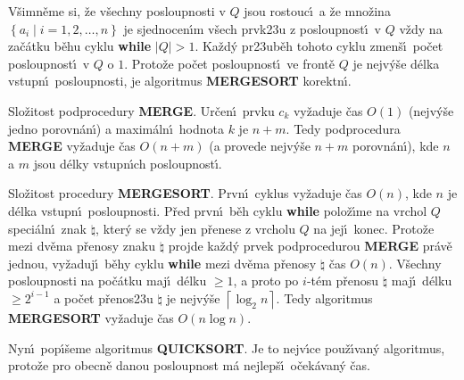 \flushpar V\v simn\v eme si, \v ze v\v sechny posloupnosti v $Q$ jsou 
rostouc\'\i\ a \v ze mno\v zina $\left\{a_i\mid i=1,2,\dots,n\right\}$ je sjednocen\'\i m 
v\v sech prvk\accent23u z posloupnost\'\i\ v $Q$ v\v zdy na za\v c\'atku 
b\v ehu cyklu {\bf while} $|Q|>1$. Ka\v zd\'y pr\accent23ub\v eh tohoto 
cyklu zmen\v s\'\i\ po\v cet posloupnost\'\i\ v $Q$ o $1$. Proto\v ze po\v cet 
posloupnost\'\i\ ve front\v e $Q$ je nejv\'y\v se d\'elka vstupn\'\i\ 
posloupnosti, je algoritmus 
{\bf MERGE\-SORT} korektn\'\i .
\medskip

\flushpar Slo\v zitost podprocedury {\bf MERGE}. Ur\v cen\'\i\ prvku $c_k$ 
vy\v za\-du\-je \v cas $O\left(1\right)$ (nejv\'y\v se jedno porovn\'an\'\i ) a 
maxim\'aln\'\i\ hodnota $k$ je $n+m$. Tedy 
podprocedura {\bf MERGE} vy\v zaduje \v cas $O\left(n+m\right)$ (a provede 
nejv\'y\v se $n+m$ 
porovn\'an\'\i ), kde $n$ a $m$ jsou d\'elky vstupn\'\i ch posloupnost\'\i .
\medskip

\flushpar Slo\v zitost procedury {\bf MERGESORT}. 
Prvn\'\i\ cyklus vy\v zaduje \v cas $O\left(n\right)$, kde $n$ je d\'elka vstupn\'\i\ posloupnosti. 
P\v red prvn\'\i\ b\v eh cyklu {\bf while} polo\v z\'\i me na vrchol $Q$ speci\'aln\'\i\ 
znak $\natural$, kter\'y se v\v zdy jen 
p\v renese z vrcholu $Q$ na jej\'\i\ konec. Proto\v ze mezi dv\v ema 
p\v renosy znaku $\natural$ projde ka\v zd\'y prvek 
podprocedurou {\bf MERGE} pr\'av\v e jednou, vy\v zaduj\'\i\ b\v ehy cyklu 
{\bf while} mezi dv\v ema p\v renosy $\natural$ \v cas $
O\left(n\right)$. V\v sech\-ny posloupnosti 
na po\v c\'atku maj\'\i\ d\'elku $\ge 1$, a proto po $i$-t\'em p\v renosu 
$\natural$ maj\'\i\ d\'elku $\ge 2^{i-1}$ a po\v cet p\v renos\accent23u 
$\natural$ je 
nejv\'y\v se $\left\lceil\log_2n\right\rceil$. Tedy algoritmus {\bf MERGESORT }
vy\v zaduje \v cas $O\left(n\log n\right)$.
\medskip

\flushpar Nyn\'\i\ pop\'\i\v seme algoritmus {\bf QUICKSORT}. Je to 
nejv\'\i ce pou\-\v z\'\i van\'y algoritmus, proto\v ze pro obecn\v e danou 
posloupnost m\'a nejlep\v s\'\i\ o\v cek\'avan\'y \v cas. 
\bigskip

